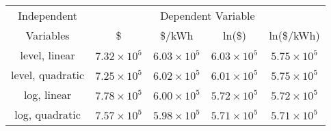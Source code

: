 \begin{tabular}{|c|cccc|}\hline
Independent & \multicolumn{4}{c|}{Dependent Variable}  \\ \cline{2-5}
Variables &  \$  \Tstrut  &  \$/kWh  & ln(\$) & ln(\$/kWh)  \\\hline
level, linear     &   $7.32 \times 10^5 $     &  $6.03 \times 10^5 $ & $6.03 \times 10^5 $  &  $5.75 \times 10^5 $  \\
level, quadratic   &   $7.25 \times 10^5 $     &  $6.02 \times 10^5 $ & $6.01 \times 10^5 $  &  $5.75 \times 10^5 $  \\
log, linear     &   $7.78 \times 10^5 $ &    $6.00 \times 10^5$  & $5.72 \times 10^5 $ & $5.72 \times 10^5 $ \\
log, quadratic  &   $7.57 \times 10^5 $ &    $5.98 \times 10^5$  & $5.71 \times 10^5 $ & $5.71  \times 10^5 $ \\\hline
\end{tabular}